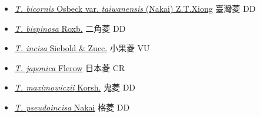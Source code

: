 \begin{itemize}
  \begin{itemize}
        \item[] \href{http://www.theplantlist.org/tpl1.1/search?q=Trapa+bicornis+var.+taiwanensis}{\textit{T. bicornis} Osbeck var. \textit{taiwanensis} (Nakai) Z.T.Xiong}   臺灣菱   DD
        \item[] \href{http://www.theplantlist.org/tpl1.1/search?q=Trapa+bispinosa}{\textit{T. bispinosa} Roxb.}   二角菱   DD
        \item[] \href{http://www.theplantlist.org/tpl1.1/search?q=Trapa+incisa}{\textit{T. incisa} Siebold \& Zucc.}   小果菱   VU
        \item[] \href{http://www.theplantlist.org/tpl1.1/search?q=Trapa+japonica}{\textit{T. japonica} Flerow}   日本菱   CR
        \item[] \href{http://www.theplantlist.org/tpl1.1/search?q=Trapa+maximowiczii}{\textit{T. maximowiczii} Korsh.}   鬼菱   DD
        \item[] \href{http://www.theplantlist.org/tpl1.1/search?q=Trapa+pseudoincisa}{\textit{T. pseudoincisa} Nakai}   格菱   DD
  \end{itemize}
  \end{itemize}
